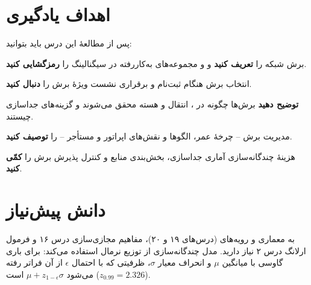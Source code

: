 \documentclass[11pt,a4paper]{article}
\begin{document}
\ACNcover

\section{اهداف یادگیری}
پس از مطالعهٔ این درس باید بتوانید:
\begin{objectives}
  \item برش شبکه را \textbf{تعریف کنید} و  و مجموعه‌های  به‌کاررفته در سیگنالینگ را \textbf{رمزگشایی کنید}.
  \item انتخاب برش هنگام ثبت‌نام و برقراری نشست  ویژهٔ برش را \textbf{دنبال کنید}.
  \item \textbf{توضیح دهید} برش‌ها چگونه در ، انتقال و هسته محقق می‌شوند و گزینه‌های جداسازی چیستند.
  \item مدیریت برش -- چرخهٔ عمر، الگوها و نقش‌های اپراتور و مستأجر -- را \textbf{توصیف کنید}.
  \item هزینهٔ چندگانه‌سازی آماری جداسازی، بخش‌بندی منابع  و کنترل پذیرش برش را \textbf{کمّی کنید}.
\end{objectives}

\section{دانش پیش‌نیاز}
به معماری و رویه‌های  (درس‌های ۱۹ و ۲۰)، مفاهیم مجازی‌سازی درس ۱۶ و فرمول ارلانگ  درس ۲ نیاز دارید. مدل
چندگانه‌سازی از توزیع نرمال استفاده می‌کند: برای باری گاوسی با میانگین $\mu$ و انحراف معیار $\sigma$، ظرفیتی که با احتمال $\epsilon$
از آن فراتر رفته می‌شود $\mu + z_{1-\epsilon}\sigma$ است ($z_{0.99} = 2.326$).
\end{document}
